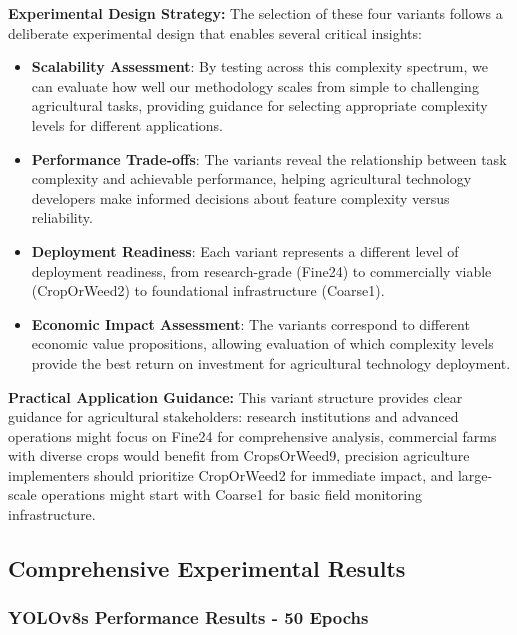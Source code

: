 \textbf{Experimental Design Strategy:} The selection of these four variants follows a deliberate experimental design that enables several critical insights:

\begin{itemize}
    \item \textbf{Scalability Assessment}: By testing across this complexity spectrum, we can evaluate how well our methodology scales from simple to challenging agricultural tasks, providing guidance for selecting appropriate complexity levels for different applications.
    
    \item \textbf{Performance Trade-offs}: The variants reveal the relationship between task complexity and achievable performance, helping agricultural technology developers make informed decisions about feature complexity versus reliability.
    
    \item \textbf{Deployment Readiness}: Each variant represents a different level of deployment readiness, from research-grade (Fine24) to commercially viable (CropOrWeed2) to foundational infrastructure (Coarse1).
    
    \item \textbf{Economic Impact Assessment}: The variants correspond to different economic value propositions, allowing evaluation of which complexity levels provide the best return on investment for agricultural technology deployment.
\end{itemize}

\textbf{Practical Application Guidance:} This variant structure provides clear guidance for agricultural stakeholders: research institutions and advanced operations might focus on Fine24 for comprehensive analysis, commercial farms with diverse crops would benefit from CropsOrWeed9, precision agriculture implementers should prioritize CropOrWeed2 for immediate impact, and large-scale operations might start with Coarse1 for basic field monitoring infrastructure.

\subsection{Comprehensive Experimental Results}

\subsubsection{YOLOv8s Performance Results - 50 Epochs}

